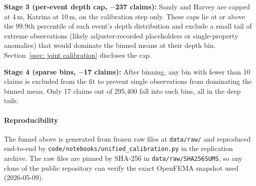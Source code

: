 \textbf{Stage 3 (per-event depth cap, $-$237 claims):} Sandy and Harvey are capped at 4\,m, Katrina at 10\,m, on the calibration step only. These caps lie at or above the 99.9th percentile of each event's depth distribution and exclude a small tail of extreme observations (likely adjuster-recorded placeholders or single-property anomalies) that would dominate the binned means at their depth bin. Section~\ref{ssec: joint calibration} discloses the cap.

\textbf{Stage 4 (sparse bins, $-$17 claims):} After binning, any bin with fewer than 10 claims is excluded from the fit to prevent single observations from dominating the binned mean. Only 17 claims out of 295{,}400 fall into such bins, all in the deep tails.

\paragraph{Reproducibility}

The funnel above is generated from frozen raw files at \texttt{data/raw/} and reproduced end-to-end by \texttt{code/notebooks/unified\_calibration.py} in the replication archive. The raw files are pinned by SHA-256 in \texttt{data/raw/SHA256SUMS}, so any clone of the public repository can verify the exact OpenFEMA snapshot used (2026-05-09).
